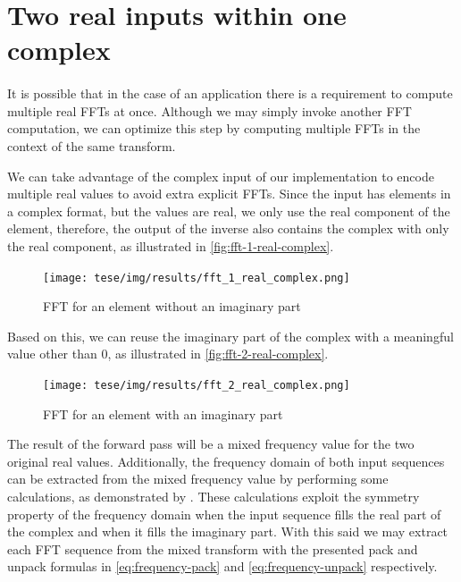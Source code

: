 \documentclass[
  oneside,
  11pt, a4paper,
  footinclude=true,
  headinclude=true,
  cleardoublepage=empty
]{scrbook}
\begin{document}
\section{Two real inputs within one complex} \label{sec:two-real-inputs-within-one-complex}
\paragraph{}
It is possible that in the case of an application there is a requirement to compute multiple real FFTs at once. Although we may simply invoke another FFT computation, we can optimize this step by computing multiple FFTs in the context of the same transform.

We can take advantage of the complex input of our implementation to encode multiple real values to avoid extra explicit FFTs. Since the input has elements in a complex format, but the values are real, we only use the real component of the element, therefore, the output of the inverse also contains the complex with only the real component, as illustrated in \autoref{fig:fft-1-real-complex}.

\begin{figure}[H] 
    \centering
    \texttt{[image: tese/img/results/fft\_1\_real\_complex.png]}
    \caption{FFT for an element without an imaginary part}
    \label{fig:fft-1-real-complex}
\end{figure}

Based on this, we can reuse the imaginary part of the complex with a meaningful value other than $0$, as illustrated in \autoref{fig:fft-2-real-complex}.

\begin{figure}[H] 
    \centering
    \texttt{[image: tese/img/results/fft\_2\_real\_complex.png]}
    \caption{FFT for an element with an imaginary part}
    \label{fig:fft-2-real-complex}
\end{figure}

The result of the forward pass will be a mixed frequency value for the two original real values. Additionally, the frequency domain of both input sequences can be extracted from the mixed frequency value by performing some calculations, as demonstrated by \cite{tworealsignalsfft}. These calculations exploit the symmetry property of the frequency domain when the input sequence fills the real part of the complex and when it fills the imaginary part. With this said we may extract each FFT sequence from the mixed transform with the presented pack and unpack formulas in \autoref{eq:frequency-pack} and \autoref{eq:frequency-unpack} respectively.
\end{document}
